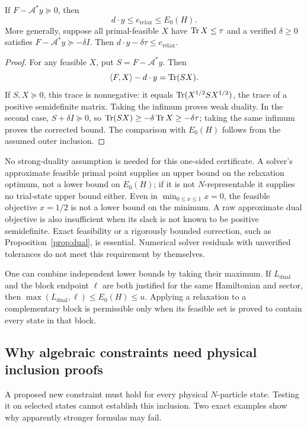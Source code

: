 \begin{proposition}
\label{prop:dual}
If $F-\mathcal A^*y\succeq0$, then
\[
 d\cdot y\le e_{\mathrm{relax}}\le E_0(H).
\]
More generally, suppose all primal-feasible $X$ have
$\operatorname{Tr} X\le\tau$ and a verified $\delta\ge0$ satisfies
$F-\mathcal A^*y\succeq-\delta I$. Then
$d\cdot y-\delta\tau\le e_{\mathrm{relax}}$.
\end{proposition}
\begin{proof}
For any feasible $X$, put $S=F-\mathcal A^*y$. Then
\[
 \langle F,X\rangle-d\cdot y=\operatorname{Tr}(SX).
\]
If $S,X\succeq0$, this trace is nonnegative: it equals
$\operatorname{Tr}(X^{1/2}SX^{1/2})$, the trace of a positive semidefinite matrix.
Taking the infimum proves weak duality. In the second case,
$S+\delta I\succeq0$, so
$\operatorname{Tr}(SX)\ge-\delta\operatorname{Tr} X\ge-\delta\tau$; taking the same infimum
proves the corrected bound. The comparison with $E_0(H)$ follows from
the assumed outer inclusion.
\end{proof}

No strong-duality assumption is needed for this one-sided certificate.
A solver's approximate feasible primal point supplies an upper bound on the
relaxation optimum, not a lower bound on $E_0(H)$; if it is not
$N$-representable it supplies no trial-state upper bound either. Even in
$\min_{0\le x\le1}x=0$, the feasible objective $x=1/2$ is not a lower
bound on the minimum. A raw approximate dual objective is also insufficient
when its slack is not known to be positive semidefinite. Exact feasibility
or a rigorously bounded correction, such as Proposition~\ref{prop:dual},
is essential. Numerical solver residuals with unverified tolerances do not
meet this requirement by themselves.

One can combine independent lower bounds by taking their maximum. If
$L_{\mathrm{dual}}$ and the block endpoint $\ell$ are both justified for
the same Hamiltonian and sector, then
$\max(L_{\mathrm{dual}},\ell)\le E_0(H)\le u$. Applying a relaxation
to a complementary block is permissible only when its feasible set is proved
to contain every state in that block.

\subsection{Why algebraic constraints need physical inclusion proofs}
A proposed new constraint must hold for every physical $N$-particle state.
Testing it on selected states cannot establish this inclusion. Two exact
examples show why apparently stronger formulas may fail.

